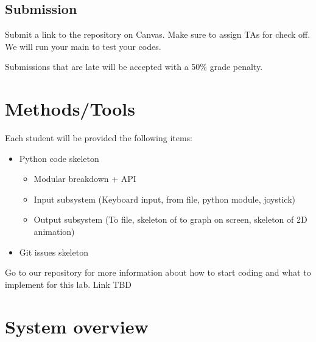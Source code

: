 \documentclass[letterpaper,11pt]{article}
\begin{document}
\subsection{Submission}
Submit a link to the repository on Canvas.
Make sure to assign TAs for check off. We will run your main to test your codes.

Submissions that are late will be accepted with a 50$\%$ grade penalty. 

\section{Methods/Tools}
Each student will be provided the following items:
\begin{itemize}
    \item Python code skeleton
\begin{itemize}
    \item Modular breakdown + API
    \item Input subsystem (Keyboard input, from file, python module, joystick)
    \item Output subsystem (To file, skeleton of to graph on screen, skeleton of 2D animation)
\end{itemize}
    \item Git issues skeleton
\end{itemize}

Go to our repository for more information about how to start coding and what to implement for this lab.
Link TBD



\appendix

\section{System overview}
\end{document}
